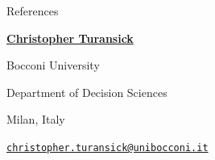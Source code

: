 
\prefix{}
\begin{rubric}{References}

\entry*[]
\textbf{\href{https://sites.google.com/view/christopherturansick/home?authuser=0}{Christopher Turansick}}\par
Bocconi University\par
Department of Decision Sciences\par
Milan, Italy\par
\href{mailto:christopher.turansick@unibocconi.it}{\texttt{christopher.turansick@unibocconi.it}}
\end{rubric}
